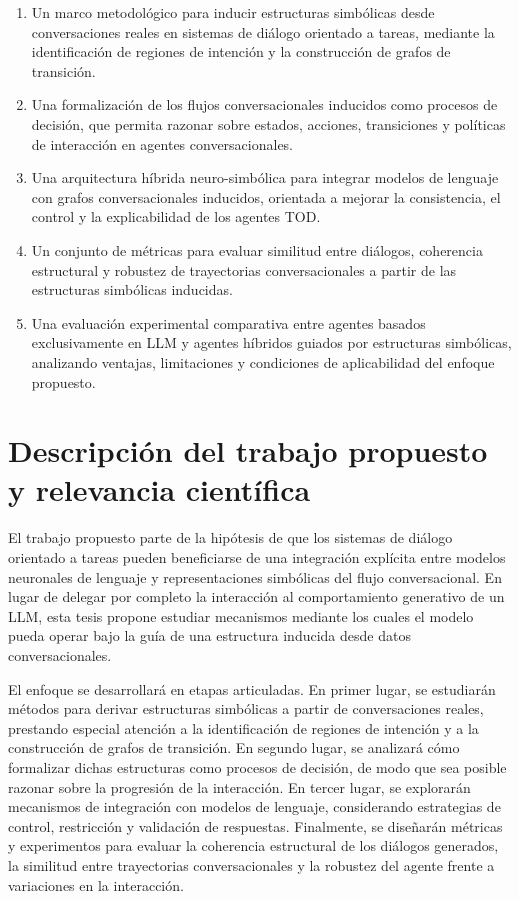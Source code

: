 \begin{enumerate}
\item Un marco metodológico para inducir estructuras simbólicas desde conversaciones
reales en sistemas de diálogo orientado a tareas, mediante la identificación de regiones
de intención y la construcción de grafos de transición.

\item Una formalización de los flujos conversacionales inducidos como procesos de
decisión, que permita razonar sobre estados, acciones, transiciones y políticas de
interacción en agentes conversacionales.

\item Una arquitectura híbrida neuro-simbólica para integrar modelos de lenguaje
con grafos conversacionales inducidos, orientada a mejorar la consistencia, el control
y la explicabilidad de los agentes \ac{TOD}.

\item Un conjunto de métricas para evaluar similitud entre diálogos, coherencia
estructural y robustez de trayectorias conversacionales a partir de las estructuras
simbólicas inducidas.

\item Una evaluación experimental comparativa entre agentes basados exclusivamente
en \ac{LLM} y agentes híbridos guiados por estructuras simbólicas, analizando ventajas,
limitaciones y condiciones de aplicabilidad del enfoque propuesto.
\end{enumerate}

\section{Descripción del trabajo propuesto y relevancia científica}

El trabajo propuesto parte de la hipótesis de que los sistemas de diálogo orientado a
tareas pueden beneficiarse de una integración explícita entre modelos neuronales de
lenguaje y representaciones simbólicas del flujo conversacional. En lugar de delegar
por completo la interacción al comportamiento generativo de un \ac{LLM}, esta tesis
propone estudiar mecanismos mediante los cuales el modelo pueda operar bajo la guía
de una estructura inducida desde datos conversacionales.

El enfoque se desarrollará en etapas articuladas. En primer lugar, se estudiarán métodos
para derivar estructuras simbólicas a partir de conversaciones reales, prestando especial
atención a la identificación de regiones de intención y a la construcción de grafos de
transición. En segundo lugar, se analizará cómo formalizar dichas estructuras como
procesos de decisión, de modo que sea posible razonar sobre la progresión de la
interacción. En tercer lugar, se explorarán mecanismos de integración con modelos de
lenguaje, considerando estrategias de control, restricción y validación de respuestas.
Finalmente, se diseñarán métricas y experimentos para evaluar la coherencia estructural
de los diálogos generados, la similitud entre trayectorias conversacionales y la robustez
del agente frente a variaciones en la interacción.

